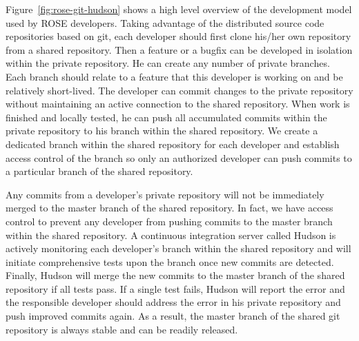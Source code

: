 Figure~\ref{fig:rose-git-hudson} shows a high level overview of the development model used by 
ROSE developers. Taking advantage of the distributed source code repositories based on git, 
each developer should first clone his/her own repository from a shared repository.
Then a feature or a bugfix can be developed in isolation within the private repository.
He can create any number of private branches. Each branch should relate to a
feature that this developer is working on and be relatively short-lived. 
The developer can commit changes to the private repository without
maintaining an active connection to 
the shared repository.  When work is finished and locally tested, he can push all accumulated commits within the private repository 
to his branch within the shared repository. 
We create a dedicated branch within the shared repository for each developer and establish access control of the
branch so only an authorized developer can push commits to a particular branch of the shared repository. 

Any commits from a developer's private repository will not be immediately merged to the master branch
of the shared repository. In fact, we have access control to prevent any developer from pushing commits 
to the master branch within the shared repository.
A continuous integration server called Hudson is actively monitoring each developer's branch within the shared repository 
and will initiate comprehensive tests upon the branch once new commits are detected.
Finally, Hudson will merge the new commits to the master branch of the shared repository if all tests pass.
If a single test fails, Hudson will report the error and the responsible developer should address the error in 
his private repository and push improved commits again. 
As a result, the master branch of the shared git repository is always stable and can be readily released.  

